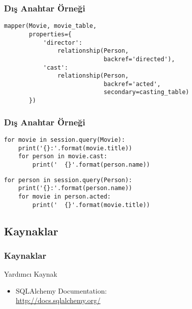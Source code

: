 \documentclass[dvipsnames]{beamer}
\theoremstyle{plain}
\begin{document}
\begin{frame}[fragile]
  \frametitle{Dış Anahtar Örneği}

  \begin{lstlisting}
mapper(Movie, movie_table,
       properties={
           'director':
               relationship(Person,
                            backref='directed'),
           'cast':
               relationship(Person,
                            backref='acted',
                            secondary=casting_table)
       })
  \end{lstlisting}
\end{frame}

\begin{frame}[fragile]
  \frametitle{Dış Anahtar Örneği}

  \begin{lstlisting}
for movie in session.query(Movie):
    print('{}:'.format(movie.title))
    for person in movie.cast:
        print('  {}'.format(person.name))
  \end{lstlisting}

  \pause
  \begin{lstlisting}
for person in session.query(Person):
    print('{}:'.format(person.name))
    for movie in person.acted:
        print('  {}'.format(movie.title))
  \end{lstlisting}
\end{frame}

\subsection*{Kaynaklar}

\begin{frame}
  \frametitle{Kaynaklar}

  \begin{block}{Yardımcı Kaynak}
    \begin{itemize}
      \item SQLAlchemy Documentation:\\
        \url{http://docs.sqlalchemy.org/}
    \end{itemize}
  \end{block}
\end{frame}
\end{document}
